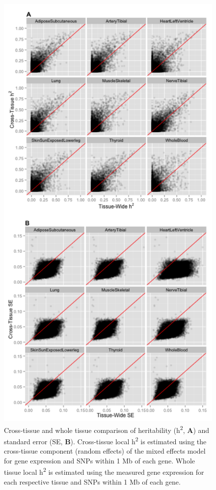 \documentclass[]{article}
\begin{document}
\begin{figure}[htbp]
\centering
\includegraphics{GenArch_manuscript_files/figure-latex/TWotdH2SE-1.pdf}
\caption{Cross-tissue and whole tissue comparison of heritability
(h\textsuperscript{2}, \textbf{A}) and standard error (SE, \textbf{B}).
Cross-tissue local h\textsuperscript{2} is estimated using the
cross-tissue component (random effects) of the mixed effects model for
gene expression and SNPs within 1 Mb of each gene. Whole tissue local
h\textsuperscript{2} is estimated using the measured gene expression for
each respective tissue and SNPs within 1 Mb of each gene.}
\end{figure}
\end{document}

